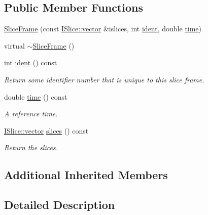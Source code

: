 \subsection*{Public Member Functions}
\begin{DoxyCompactItemize}
\item 
\hyperlink{class_wire_cell_1_1_img_1_1_data_1_1_slice_frame_a8f881e59fc8dbff4a4cd7f9a06060bf5}{Slice\+Frame} (const \hyperlink{class_wire_cell_1_1_i_data_ae1a9f863380499bb43f39fabb6276660}{I\+Slice\+::vector} \&islices, int \hyperlink{class_wire_cell_1_1_img_1_1_data_1_1_slice_frame_a958796aa5c7faa7b6a2195d30a4b5f2a}{ident}, double \hyperlink{class_wire_cell_1_1_img_1_1_data_1_1_slice_frame_ac93b4f236d7982be45074f9358fe5e0f}{time})
\item 
virtual \hyperlink{class_wire_cell_1_1_img_1_1_data_1_1_slice_frame_aa0b0e80f90cbd06ff7515ab500a719d5}{$\sim$\+Slice\+Frame} ()
\item 
int \hyperlink{class_wire_cell_1_1_img_1_1_data_1_1_slice_frame_a958796aa5c7faa7b6a2195d30a4b5f2a}{ident} () const
\begin{DoxyCompactList}\small\item\em Return some identifier number that is unique to this slice frame. \end{DoxyCompactList}\item 
double \hyperlink{class_wire_cell_1_1_img_1_1_data_1_1_slice_frame_ac93b4f236d7982be45074f9358fe5e0f}{time} () const
\begin{DoxyCompactList}\small\item\em A reference time. \end{DoxyCompactList}\item 
\hyperlink{class_wire_cell_1_1_i_data_ae1a9f863380499bb43f39fabb6276660}{I\+Slice\+::vector} \hyperlink{class_wire_cell_1_1_img_1_1_data_1_1_slice_frame_a5fc36949d12f7fb66ef1b6decdf774b5}{slices} () const
\begin{DoxyCompactList}\small\item\em Return the slices. \end{DoxyCompactList}\end{DoxyCompactItemize}
\subsection*{Additional Inherited Members}


\subsection{Detailed Description}


